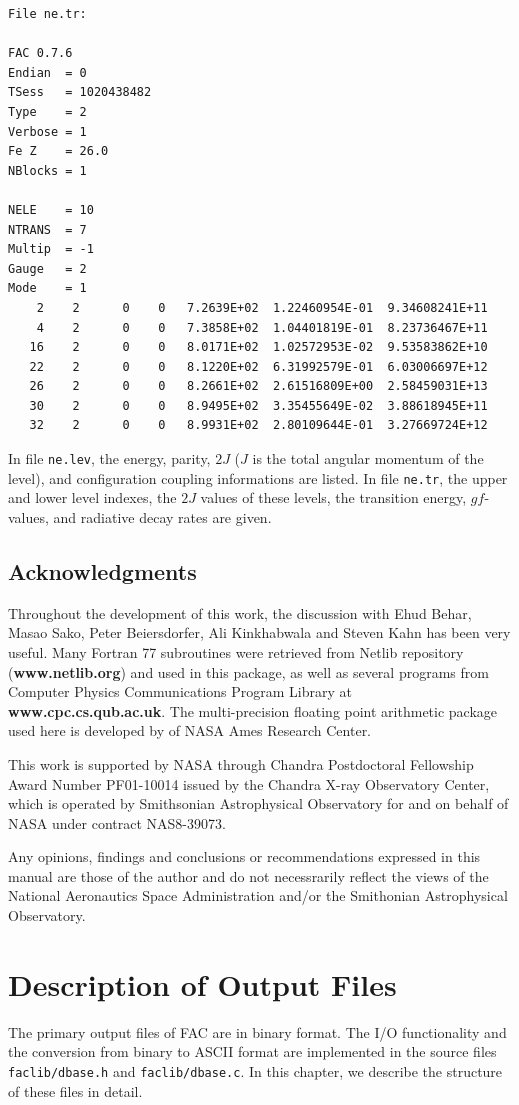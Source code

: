 \documentclass[twoside,letterpaper]{refrep}
\begin{document}
\begin{verbatim}
File ne.tr:

FAC 0.7.6
Endian	= 0
TSess	= 1020438482
Type	= 2
Verbose	= 1
Fe Z	= 26.0
NBlocks	= 1

NELE	= 10
NTRANS	= 7
Multip	= -1
Gauge	= 2
Mode	= 1
    2	 2	    0	 0	 7.2639E+02  1.22460954E-01  9.34608241E+11
    4	 2	    0	 0	 7.3858E+02  1.04401819E-01  8.23736467E+11
   16	 2	    0	 0	 8.0171E+02  1.02572953E-02  9.53583862E+10
   22	 2	    0	 0	 8.1220E+02  6.31992579E-01  6.03006697E+12
   26	 2	    0	 0	 8.2661E+02  2.61516809E+00  2.58459031E+13
   30	 2	    0	 0	 8.9495E+02  3.35455649E-02  3.88618945E+11
   32	 2	    0	 0	 8.9931E+02  2.80109644E-01  3.27669724E+12
\end{verbatim}

In file \verb|ne.lev|, the energy, parity, $2J$ ($J$ is the total
angular momentum of the level), and configuration coupling informations are
listed. In file \verb|ne.tr|, the upper and lower level indexes, the $2J$
values of these levels, the transition energy, $gf$-values, and radiative
decay rates are given.

\section*{Acknowledgments}
Throughout the development of this work, the discussion with Ehud Behar, Masao
Sako, Peter Beiersdorfer, Ali Kinkhabwala and Steven Kahn has been very
useful. Many Fortran 77 subroutines were retrieved from Netlib repository
(\textbf{www.netlib.org}) and used in this package, as well as several
programs from Computer Physics Communications Program Library at
\textbf{www.cpc.cs.qub.ac.uk}. The multi-precision floating point arithmetic
package used here is developed by \citet{bailey93} of NASA Ames Research
Center.

This work is supported by NASA through Chandra Postdoctoral Fellowship Award
Number PF01-10014 issued by the Chandra X-ray Observatory Center, which is
operated by Smithsonian Astrophysical Observatory for and on behalf of NASA
under contract NAS8-39073. 

Any opinions, findings and conclusions or
recommendations expressed in this manual are those of the author and do not
necessrarily reflect the views of the National Aeronautics Space
Administration and/or the Smithonian Astrophysical Observatory.

\chapter{Description of Output Files}
\label{cha:format}
The primary output files of FAC are in binary format. The I/O functionality
and the conversion from binary to ASCII format are implemented in the source
files \verb|faclib/dbase.h| and \verb|faclib/dbase.c|. In this chapter, we
describe the structure of these files in detail.
\end{document}
